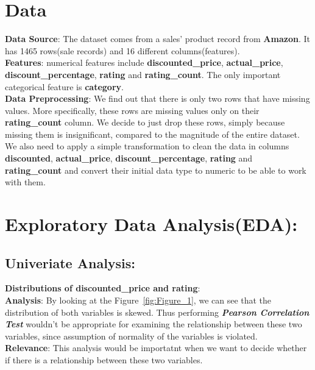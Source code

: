 \documentclass[a4paper,12pt]{article}
\begin{document}
\section*{Data}
\textbf{Data Source}: The dataset comes from a sales' product record from \textbf{Amazon}. It has 1465 rows(sale records) and 16 different columns(features). \\

\noindent\textbf{Features}: numerical features include \textbf{discounted\_price}, \textbf{actual\_price}, \textbf{discount\_percentage}, \textbf{rating} and \textbf{rating\_count}.  The only important categorical feature is \textbf{category}. \\ 

\noindent\textbf{Data Preprocessing}: We find out that there is only two rows that have missing values. More specifically, these rows are missing values only on their \textbf{rating\_count} column.  We decide to just drop these rows, simply because missing them is insignificant, compared to the magnitude of the entire dataset.  We also need to apply a simple transformation to clean the data in columns \textbf{discounted}, \textbf{actual\_price}, \textbf{discount\_percentage}, \textbf{rating} and \textbf{rating\_count} and convert their initial data type to numeric to be able to work with them.


\section*{Exploratory Data Analysis(EDA):}
\subsection*{Univeriate Analysis:}
\textbf{Distributions of discounted\_price and rating}: \\

\noindent\textbf{Analysis}: By looking at the Figure~\ref{fig:Figure_1}, we can see that the distribution of both variables is skewed. Thus performing \textit{\textbf{Pearson Correlation Test}} wouldn't be appropriate for examining the relationship between these two variables, since assumption of normality of the variables is violated. \\

\noindent\textbf{Relevance}: This analysis would be importatnt when we want to decide whether if there is a relationship between these two variables. \\
\end{document}
